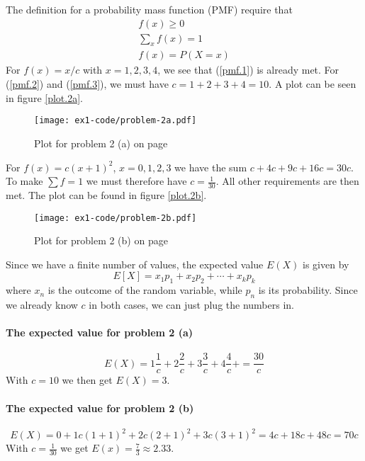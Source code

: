 \documentclass[a4paper,english,12pt]{article}
\begin{document}
The definition for a probability mass function (PMF) require that
\begin{gather}
  f(x) \geqslant 0 \label{pmf.1} \\
  \sum_x{f(x)} = 1 \label{pmf.2} \\
  f(x) = P(X=x) \label{pmf.3}
\end{gather}
For $f(x) = x/c$ with $x=1,2,3,4$, we see that (\ref{pmf.1}) is already met.
For (\ref{pmf.2}) and (\ref{pmf.3}), we must have $c=1+2+3+4=10$. A plot can be
seen in figure \vref{plot.2a}.

\begin{figure}[h]
  \texttt{[image: ex1-code/problem-2a.pdf]}
  \caption{Plot for problem 2 (a) on page \pageref{problem.2 (a)}}
  \label{plot.2a}
\end{figure}

For $f(x) = c(x+1)^2$, $x=0,1,2,3$ we have the sum $c+4c+9c+16c=30c$. To make
$\sum{f}=1$ we must therefore have $c=\frac{1}{30}$. All other requirements are
then met. The plot can be found in figure \vref{plot.2b}.

\begin{figure}[h]
  \texttt{[image: ex1-code/problem-2b.pdf]}
  \caption{Plot for problem 2 (b) on page \pageref{problem.2 (b)}}
  \label{plot.2b}
\end{figure}

Since we have a finite number of values, the expected value $E(X)$ is given by
\[
  E[X] = x_1p_1 + x_2p_2 + \cdots + x_kp_k
\]
where $x_n$ is the outcome of the random variable, while $p_n$ is its
probability. Since we already know $c$ in both cases, we can just plug the
numbers in.

\paragraph{The expected value for problem 2 (a)}
\[
  E(X) =
      1\frac{1}{c} +
      2\frac{2}{c} +
      3\frac{3}{c} +
      4\frac{4}{c} +
      = \frac{30}{c}
\]
With $c=10$ we then get $E(X) = 3$.

\paragraph{The expected value for problem 2 (b)}
\[
  E(X) =
    0 +
    1 c(1+1)^2 +
    2 c(2+1)^2 +
    3 c(3+1)^2 =
    4c + 18c + 48c = 70c
\]
With $c=\frac{1}{30}$ we get $E(x) = \frac{7}{3} \approx 2.33$.
\end{document}
